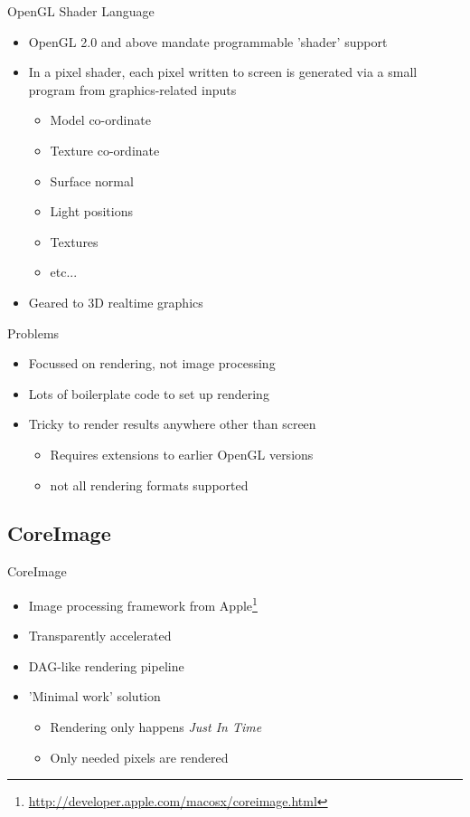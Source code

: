 \documentclass{beamer}
\newcommand{\bi}{\begin{itemize}}
\newcommand{\ei}{\end{itemize}}
\begin{document}
\begin{frame}{OpenGL Shader Language}
  \bi

  \item OpenGL 2.0 and above mandate programmable 'shader' support

  \item In a pixel shader, each pixel written to screen is generated via a
  small program from graphics-related inputs
  \bi
    \item Model co-ordinate
    \item Texture co-ordinate
    \item Surface normal
    \item Light positions
    \item Textures
    \item etc...
  \ei

  \item Geared to 3D realtime graphics

  \ei
\end{frame}

\begin{frame}


C}]{glsl-example.c}

\end{frame}

\begin{frame}{Problems}
  \bi
    \item Focussed on rendering, not image processing
    \item Lots of boilerplate code to set up rendering
    \item Tricky to render results anywhere other than screen
    \bi
      \item Requires extensions to earlier OpenGL versions
      \item not all rendering formats supported
    \ei
  \ei
\end{frame}


\subsection{CoreImage} %

\begin{frame}{CoreImage}
  \bi
    \item Image processing framework from
    Apple\footnote{\url{http://developer.apple.com/macosx/coreimage.html}}
    \item Transparently accelerated
    \item DAG-like rendering pipeline
    \item 'Minimal work' solution
    \bi
      \item Rendering only happens \emph{Just In Time}
      \item Only needed pixels are rendered
    \ei
  \ei
\end{frame}
\end{document}
